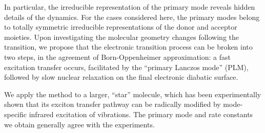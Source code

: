 In particular, the irreducible representation of the primary mode reveals
hidden details of the dynamics. For the cases considered here, the primary modes belong to totally symmetric irreducible representations  of
the donor and acceptor moieties. Upon investigating the molecular geometry changes following  the transition,   we propose that the electronic transition process can be
broken into two steps, in the agreement of Born-Oppenheimer approximation:  a fast excitation transfer occurs, facilitated by the ``primary Lanczos mode'' (PLM),
followed by slow nuclear relaxation on the final electronic diabatic surface.

We apply the method to a larger, ``star'' molecule, which has been experimentally shown  that its exciton transfer pathway can be radically modified by mode-specific infrared excitation of vibrations. The primary mode and rate constants we obtain generally agree with the experiments.
\endgroup
\vfill
